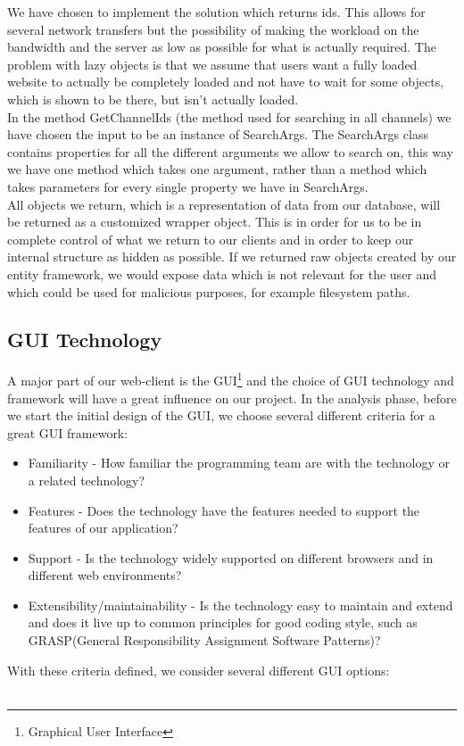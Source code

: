 \documentclass[a4paper,11pt,report]{article}
\begin{document}
{We have chosen to implement the solution which returns ids. This allows for several network transfers but the possibility of making the workload on the bandwidth and the server as low as possible for what is actually required. The problem with lazy objects is that we assume that users want a fully loaded website to actually be completely loaded and not have to wait for some objects, which is shown to be there, but isn't actually loaded. \\
In the method GetChannelIds (the method used for searching in all channels) we have chosen the input to be an instance of SearchArgs. The SearchArgs class contains properties for all the different arguments we allow to search on, this way we have one method which takes one argument, rather than a method which takes parameters for every single property we have in SearchArgs. \\
All objects we return, which is a representation of data from our database, will be returned as a customized wrapper object. This is in order for us to be in complete control of what we return to our clients and in order to keep our internal structure as hidden as possible. If we returned raw objects created by our entity framework, we would expose data which is not relevant for the user and which could be used for malicious purposes, for example filesystem paths.

\subsection{GUI Technology}
A major part of our web-client is the GUI\footnote{Graphical User Interface} and the choice of GUI technology and framework will have a great influence on our project. In the analysis phase, before we start the initial design of the GUI, we choose several different criteria for a great GUI framework:
\begin{itemize}
\item Familiarity - How familiar the programming team are with the technology or a related technology?
\item Features - Does the technology have the features needed to support the features of our application?
\item Support - Is the technology widely supported on different browsers and in different web environments?
\item Extensibility/maintainability - Is the technology easy to maintain and extend and does it live up to common principles for good coding style, such as GRASP(General Responsibility Assignment Software Patterns)?
\end{itemize}
With these criteria defined, we consider several different GUI options: \\ \\

}
\end{document}
